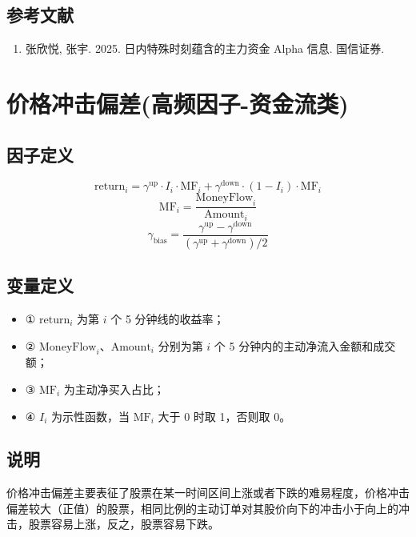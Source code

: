 \documentclass{article}
\begin{document}
\subsection{参考文献}
\begin{enumerate}
    \item 张欣悦, 张宇. 2025. 日内特殊时刻蕴含的主力资金 Alpha 信息. 国信证券.
\end{enumerate}

\section{价格冲击偏差(高频因子-资金流类)}

\subsection{因子定义}

\begin{equation}
    \mathrm{return}_i = \gamma^{\mathrm{up}} \cdot I_i \cdot \mathrm{MF}_i + \gamma^{\mathrm{down}} \cdot (1 - I_i) \cdot \mathrm{MF}_i
\end{equation}
\begin{equation}
    \mathrm{MF}_i = \frac{\mathrm{MoneyFlow}_i}{\mathrm{Amount}_i}
\end{equation}
\begin{equation}
    \gamma_{\mathrm{bias}} = \frac{\gamma^{\mathrm{up}} - \gamma^{\mathrm{down}}}{(\gamma^{\mathrm{up}} + \gamma^{\mathrm{down}})/2}
\end{equation}

\subsection{变量定义}
\begin{itemize}
    \item ① \( \mathrm{return}_i \) 为第 \( i \) 个 5 分钟线的收益率；
    \item ② \( \mathrm{MoneyFlow}_i \)、\( \mathrm{Amount}_i \) 分别为第 \( i \) 个 5 分钟内的主动净流入金额和成交额；
    \item ③ \( \mathrm{MF}_i \) 为主动净买入占比；
    \item ④ \( I_i \) 为示性函数，当 \( \mathrm{MF}_i \) 大于 0 时取 1，否则取 0。
\end{itemize}

\subsection{说明}
价格冲击偏差主要表征了股票在某一时间区间上涨或者下跌的难易程度，价格冲击偏差较大（正值）的股票，相同比例的主动订单对其股价向下的冲击小于向上的冲击，股票容易上涨，反之，股票容易下跌。
\end{document}
